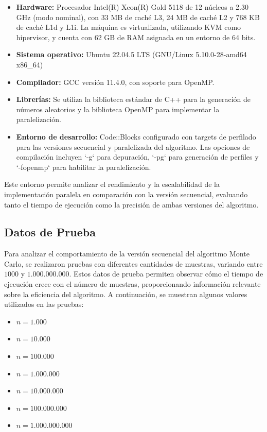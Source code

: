 \documentclass[a4paper, 10pt]{IEEEtran}
\begin{document}
\begin{itemize}
  \item \textbf{Hardware:} Procesador Intel(R) Xeon(R) Gold 5118 de 12 núcleos a 2.30 GHz (modo nominal), con 33 MB de caché L3, 24 MB de caché L2 y 768 KB de caché L1d y L1i. La máquina es virtualizada, utilizando KVM como hipervisor, y cuenta con 62 GB de RAM asignada en un entorno de 64 bits.
  
  \item \textbf{Sistema operativo:} Ubuntu 22.04.5 LTS (GNU/Linux 5.10.0-28-amd64 x86\_64)
  
  \item \textbf{Compilador:} GCC versión 11.4.0, con soporte para OpenMP.
  
  \item \textbf{Librerías:} Se utiliza la biblioteca estándar de C++ para la generación de números aleatorios y la biblioteca OpenMP para implementar la paralelización.
  
  \item \textbf{Entorno de desarrollo:} Code::Blocks configurado con targets de perfilado para las versiones secuencial y paralelizada del algoritmo. Las opciones de compilación incluyen `-g` para depuración, `-pg` para generación de perfiles y `-fopenmp` para habilitar la paralelización.
\end{itemize}

Este entorno permite analizar el rendimiento y la escalabilidad de la implementación paralela en comparación con la versión secuencial, evaluando tanto el tiempo de ejecución como la precisión de ambas versiones del algoritmo.

\subsection{Datos de Prueba}
Para analizar el comportamiento de la versión secuencial del algoritmo Monte Carlo, se realizaron pruebas con diferentes cantidades de muestras, variando entre $1000$ y $1.000.000.000$. Estos datos de prueba permiten observar cómo el tiempo de ejecución crece con el número de muestras, proporcionando información relevante sobre la eficiencia del algoritmo. A continuación, se muestran algunos valores utilizados en las pruebas:

\pagebreak

\begin{itemize}
  \item $n = 1.000$
  \item $n = 10.000$
  \item $n = 100.000$
  \item $n = 1.000.000$
  \item $n = 10.000.000$
  \item $n = 100.000.000$
  \item $n = 1.000.000.000$
\end{itemize}
\end{document}
